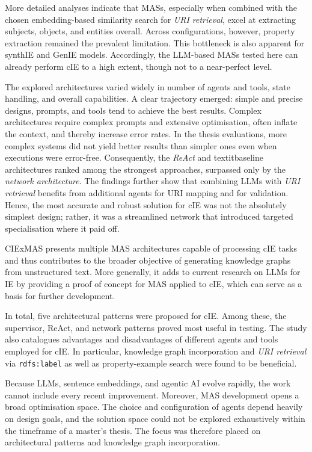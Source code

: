 \documentclass[a4paper,oneside,bibliography=totoc]{scrbook}
\begin{document}
More detailed analyses indicate that \acp{MAS}, especially when combined with the chosen embedding-based similarity search for \textit{URI retrieval}, excel at extracting subjects, objects, and entities overall. Across configurations, however, property extraction remained the prevalent limitation. This bottleneck is also apparent for synthIE and GenIE models. Accordingly, the \ac{LLM}-based \acp{MAS} tested here can already perform \ac{cIE} to a high extent, though not to a near-perfect level.

The explored architectures varied widely in number of agents and tools, state handling, and overall capabilities. A clear trajectory emerged: simple and precise designs, prompts, and tools tend to achieve the best results. Complex architectures require complex prompts and extensive optimisation, often inflate the context, and thereby increase error rates. In the thesis evaluations, more complex systems did not yield better results than simpler ones even when executions were error-free. Consequently, the \textit{ReAct} and textit{baseline architectures} ranked among the strongest approaches, surpassed only by the \textit{network architecture}. The findings further show that combining \acp{LLM} with \textit{URI retrieval} benefits from additional agents for URI mapping and for validation. Hence, the most accurate and robust solution for \ac{cIE} was not the absolutely simplest design; rather, it was a streamlined network that introduced targeted specialisation where it paid off.

CIExMAS presents multiple \ac{MAS} architectures capable of processing \ac{cIE} tasks and thus contributes to the broader objective of generating knowledge graphs from unstructured text. More generally, it adds to current research on \acp{LLM} for \ac{IE} by providing a proof of concept for \ac{MAS} applied to \ac{cIE}, which can serve as a basis for further development.

In total, five architectural patterns were proposed for \ac{cIE}. Among these, the supervisor, ReAct, and network patterns proved most useful in testing. The study also catalogues advantages and disadvantages of different agents and tools employed for \ac{cIE}. In particular, knowledge graph incorporation and \textit{URI retrieval} via \texttt{rdfs:label} as well as property-example search were found to be beneficial.

Because \acp{LLM}, sentence embeddings, and agentic AI evolve rapidly, the work cannot include every recent improvement. Moreover, \ac{MAS} development opens a broad optimisation space. The choice and configuration of agents depend heavily on design goals, and the solution space could not be explored exhaustively within the timeframe of a master’s thesis. The focus was therefore placed on architectural patterns and knowledge graph incorporation.
\end{document}
